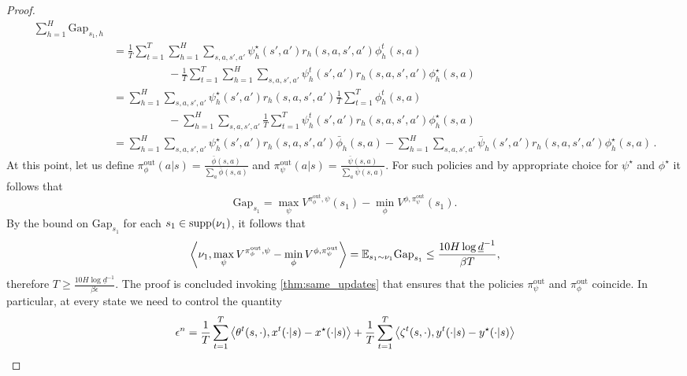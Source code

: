 \begin{proof}
\begin{align*}
\sum^H_{h=1} \mathrm{Gap}_{s_1,h} \\ &  =  \frac{1}{T}\sum^T_{t=1} \sum^H_{h=1} \sum_{s,a,s',a'}\psi^\star_h(s',a')r_h(s,a,s',a')\phi^t_h(s,a) 
\\ & \hspace{5em} - \frac{1}{T}\sum^T_{t=1} \sum^H_{h=1} \sum_{s,a,s',a'}\psi^t_h(s',a')r_h(s,a,s',a')\phi^\star_h(s,a) \\
& = \sum^H_{h=1} \sum_{s,a,s',a'}\psi^\star_h(s',a')r_h(s,a,s',a')\frac{1}{T}\sum^T_{t=1} \phi^t_h(s,a) 
\\ & \hspace{5em} -  \sum^H_{h=1} \sum_{s,a,s',a'}\frac{1}{T}\sum^T_{t=1}\psi^t_h(s',a')r_h(s,a,s',a')\phi^\star_h(s,a) \\
&= \sum^H_{h=1} \sum_{s,a,s',a'}\psi^\star_h(s',a')r_h(s,a,s',a') \bar{\phi}_h(s,a) -  \sum^H_{h=1} \sum_{s,a,s',a'}\bar{\psi}_h(s',a')r_h(s,a,s',a')\phi^\star_h(s,a)\,. %
\end{align*}
At this point, let us define $\pi^\mathrm{out}_{\phi}(a|s) = \frac{\bar{\phi}(s,a)}{\sum_a \bar{\phi}(s,a)}$ and $\pi^\mathrm{out}_{\psi}(a|s) = \frac{\bar{\psi}(s,a)}{\sum_a \bar{\psi}(s,a)}$. For such policies and by appropriate choice for $\psi^\star$ and $\phi^\star$ it follows that
$$\mathrm{Gap}_{s_1} = \max_{\psi} V^{\pi^{\mathrm{out}}_{\phi},\psi}(s_1) - \min_\phi V^{\phi,\pi^{\mathrm{out}}_{\psi}}(s_1).$$
 By the bound on $\mathrm{Gap}_{s_1}$ for each $s_1 \in \mathrm{supp}(\nu_1)$, it follows that
\begin{equation*}
    \left\langle{\nu_1},{\max_{\psi} V^{\pi^{\mathrm{out}}_{\phi},\psi} - \min_\phi V^{\phi,\pi^{\mathrm{out}}_{\psi}}}\right\rangle= \mathbb{E}_{s_1 \sim \nu_1} \mathrm{Gap}_{s_1} \leq \frac{10 H \log \underline{d}^{-1} }{\beta T},
\end{equation*}
therefore $T \geq \frac{10 H \log \underline{d}^{-1} }{\beta \epsilon}$. The proof is concluded invoking \cref{thm:same_updates} that ensures that the policies $\pi^{\mathrm{out}}_{\psi}$ and $\pi^{\mathrm{out}}_{\phi}$ coincide.
In particular, at every state we need to control the quantity
\begin{align*}
\epsilon^n = \frac{1}{T}\sum^T_{t=1}\left\langle{\theta^t(s,\cdot)},{x^t(\cdot|s) - x^\star(\cdot|s)}\right\rangle + \frac{1}{T}\sum^T_{t=1}\left\langle{\zeta^t(s,\cdot)},{y^t(\cdot|s) - y^\star(\cdot|s)}\right\rangle
\end{align*}

\end{proof}
